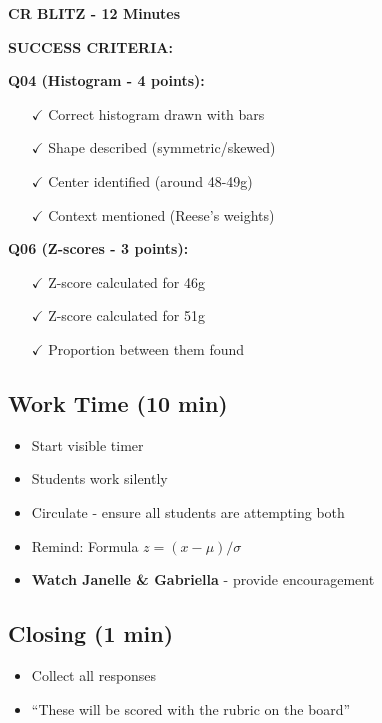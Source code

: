 \documentclass[11pt]{article}
\begin{document}
\begin{tcolorbox}[colback=gray!10!white,colframe=black,title=\textbf{Write on Board Before Class}]
\textbf{CR BLITZ - 12 Minutes}

\textbf{SUCCESS CRITERIA:}

\textbf{Q04 (Histogram - 4 points):}
\begin{itemize}[leftmargin=*]
    \item[$\checkmark$] Correct histogram drawn with bars
    \item[$\checkmark$] Shape described (symmetric/skewed)
    \item[$\checkmark$] Center identified (around 48-49g)
    \item[$\checkmark$] Context mentioned (Reese's weights)
\end{itemize}

\textbf{Q06 (Z-scores - 3 points):}
\begin{itemize}[leftmargin=*]
    \item[$\checkmark$] Z-score calculated for 46g
    \item[$\checkmark$] Z-score calculated for 51g
    \item[$\checkmark$] Proportion between them found
\end{itemize}
\end{tcolorbox}

\subsection*{Work Time (10 min)}
\begin{itemize}[leftmargin=*]
    \item Start visible timer
    \item Students work silently
    \item Circulate - ensure all students are attempting both
    \item Remind: Formula $z = (x - \mu) / \sigma$
    \item \textbf{Watch Janelle \& Gabriella} - provide encouragement
\end{itemize}

\subsection*{Closing (1 min)}
\begin{itemize}[leftmargin=*]
    \item Collect all responses
    \item ``These will be scored with the rubric on the board''
\end{itemize}
\end{document}
